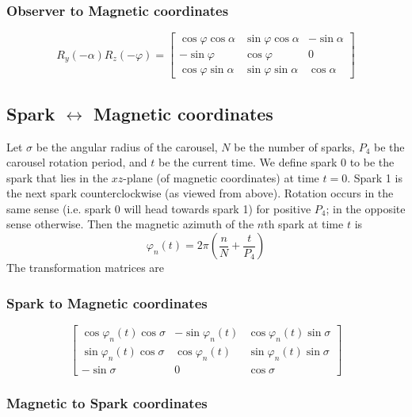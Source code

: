 \documentclass[twocolumn]{article}
\newcommand{\phase}{\varphi}
\begin{document}
\subsubsection*{Observer to Magnetic coordinates}
\begin{equation}
    R_y(-\alpha) R_z(-\phase) =
    \begin{bmatrix}
        \cos\phase\cos\alpha & \sin\phase\cos\alpha & -\sin\alpha \\
        -\sin\phase          & \cos\phase           & 0           \\
        \cos\phase\sin\alpha & \sin\phase\sin\alpha &  \cos\alpha
    \end{bmatrix}
\end{equation}

\subsection{Spark $\leftrightarrow$ Magnetic coordinates}
Let $\sigma$ be the angular radius of the carousel, $N$ be the number of sparks, $P_4$ be the carousel rotation period, and $t$ be the current time.
We define spark $0$ to be the spark that lies in the $xz$-plane (of magnetic coordinates) at time $t=0$.
Spark 1 is the next spark counterclockwise (as viewed from above).
Rotation occurs in the same sense (i.e. spark 0 will head towards spark 1) for positive $P_4$; in the opposite sense otherwise.
Then the magnetic azimuth of the $n$th spark at time $t$ is
\begin{equation}
    \phase_n(t) = 2\pi\left(\frac{n}{N} + \frac{t}{P_4}\right)
\end{equation}
The transformation matrices are

\subsubsection*{Spark to Magnetic coordinates}
\begin{equation}
    \begin{bmatrix}
        \cos\phase_n(t)\cos\sigma & -\sin\phase_n(t) & \cos\phase_n(t)\sin\sigma \\
        \sin\phase_n(t)\cos\sigma &  \cos\phase_n(t) & \sin\phase_n(t)\sin\sigma \\
        -\sin\sigma          & 0           & \cos\sigma
    \end{bmatrix}
\end{equation}

\subsubsection*{Magnetic to Spark coordinates}
\end{document}
